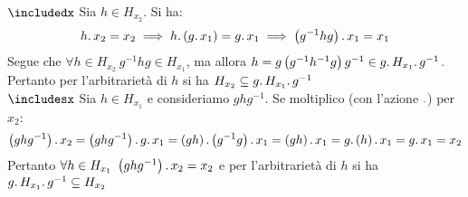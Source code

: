 \begin{demonstration}
$\includedx$ Sia $h\in H_{x_2}$. Si ha:
\begin{equation*}
h\ldotp x_2 = x_2\implies h\ldotp\left(g\ldotp x_1\right) = g\ldotp x_1 \implies \left(g^{-1} h g\right)\ldotp x_1 = x_1
\end{equation*}
Segue che $\forall h\in H_{x_2}\ g^{-1} h g\in H_{x_1}$, ma allora $h = g \left(g^{-1} h^{-1} g\right) g^{-1}\in g\ldotp H_{x_1}\ldotp g^{-1}$.
Pertanto per l'arbitrarietà di $h$ si ha $H_{x_2} \subseteq g \ldotp H_{x_1}\ldotp g^{-1} $\\
$\includesx$ Sia $h\in H_{x_1}$ e consideriamo $ghg^{-1}$. Se moltiplico (con l'azione $\ldotp$) per $x_2$:
\begin{equation*}
\left(ghg^{-1}\right)\ldotp x_2=\left(ghg^{-1}\right)\ldotp g\ldotp x_1=\left(gh\right)\ldotp \left(g^{-1}g\right)\ldotp x_1=\left(gh\right)\ldotp x_1=g\ldotp\left(h\right)\ldotp x_1=g\ldotp x_1=x_2
\end{equation*}
Pertanto $\forall h\in H_{x_1}\ \left(ghg^{-1}\right)\ldotp x_2= x_2$ e per l'arbitrarietà di $h$ si ha $g\ldotp H_{x_1}\ldotp g^{-1}\subseteq H_{x_2}$
\end{demonstration}
